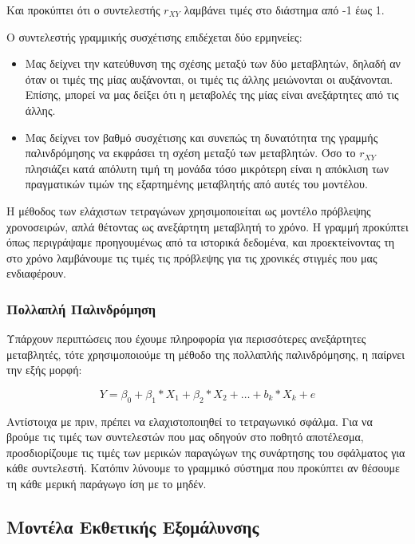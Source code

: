 Και προκύπτει ότι ο συντελεστής $r_{XY}$ λαμβάνει τιμές στο διάστημα από -1 έως 1.

Ο συντελεστής γραμμικής συσχέτισης επιδέχεται δύο ερμηνείες:

\begin{itemize}
    \item Μας δείχνει την κατεύθυνση της σχέσης μεταξύ των δύο μεταβλητών, δηλαδή αν όταν οι τιμές της μίας αυξάνονται, οι τιμές τις άλλης μειώνονται οι αυξάνονται. Επίσης, μπορεί να μας δείξει ότι η μεταβολές της μίας είναι ανεξάρτητες από τις άλλης.
    \item Μας δείχνει τον βαθμό συσχέτισης και συνεπώς τη δυνατότητα της γραμμής παλινδρόμησης να εκφράσει τη σχέση μεταξύ των μεταβλητών. Όσο το $r_{XY}$ πλησιάζει κατά απόλυτη τιμή τη μονάδα τόσο μικρότερη είναι η απόκλιση των πραγματικών τιμών της εξαρτημένης μεταβλητής από αυτές του μοντέλου.
\end{itemize}

Η μέθοδος των ελάχιστων τετραγώνων χρησιμοποιείται ως μοντέλο πρόβλεψης χρονοσειρών, απλά θέτοντας ως ανεξάρτητη μεταβλητή το χρόνο. Η γραμμή προκύπτει όπως περιγράψαμε προηγουμένως από τα ιστορικά δεδομένα, και προεκτείνοντας τη στο χρόνο λαμβάνουμε τις τιμές τις πρόβλεψης για τις χρονικές στιγμές που μας ενδιαφέρουν.

\subsubsection{Πολλαπλή Παλινδρόμηση}

Υπάρχουν περιπτώσεις που έχουμε πληροφορία για περισσότερες ανεξάρτητες μεταβλητές, τότε χρησιμοποιούμε τη μέθοδο της πολλαπλής παλινδρόμησης, η παίρνει την εξής μορφή:

\[ Y = \beta_0 + \beta_1 * X_1 + \beta_2 * X_2 + \dots + b_k * X_k + e \]

Αντίστοιχα με πριν, πρέπει να ελαχιστοποιηθεί το τετραγωνικό σφάλμα. Για να βρούμε τις τιμές των συντελεστών που μας οδηγούν στο ποθητό αποτέλεσμα, προσδιορίζουμε τις τιμές των μερικών παραγώγων της συνάρτησης του σφάλματος για κάθε συντελεστή. Κατόπιν λύνουμε το γραμμικό σύστημα που προκύπτει αν θέσουμε τη κάθε μερική παράγωγο ίση με το μηδέν. 




\subsection{Μοντέλα Εκθετικής Εξομάλυνσης}

